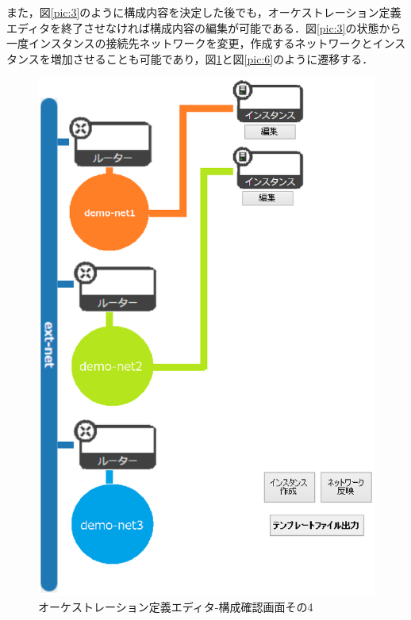 \documentclass[mingoth]{kut-paper}		%
\begin{document}
		また，図\ref{pic:3}のように構成内容を決定した後でも，オーケストレーション定義エディタを終了させなければ構成内容の編集が可能である．図\ref{pic:3}の状態から一度インスタンスの接続先ネットワークを変更，作成するネットワークとインスタンスを増加させることも可能であり，図\ref{pic:5}と図\ref{pic:6}のように遷移する．
		\begin{figure}[H]
			\begin{center}
				\includegraphics[scale=0.55]{Document/構成確認画面ex1.eps}
				\caption{オーケストレーション定義エディタ-構成確認画面その4}
				\label{pic:5}
			\end{center}
		\end{figure}
		
\end{document}
